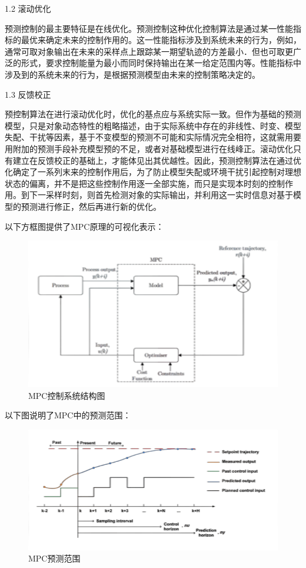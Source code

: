 1.2 滚动优化

预测控制的最主要特征是在线优化。预测控制这种优化控制算法是通过某一性能指标的最优来确定未来的控制作用的。这一性能指标涉及到系统未来的行为，例如，通常可取对象输出在未来的采样点上跟踪某一期望轨迹的方差最小．但也可取更广泛的形式，要求控制能量为最小而同时保持输出在某一给定范围内等。性能指标中涉及到的系统未来的行为，是根据预测模型由未来的控制策略决定的\cite{ArtE8}。

1.3 反馈校正

预控制算法在进行滚动优化时，优化的基点应与系统实际一致。但作为基础的预测模型，只是对象动态特性的粗略描述，由于实际系统中存在的非线性、时变、模型失配、干扰等因素，基于不变模型的预测不可能和实际情况完全相符，这就需用要用附加的预测手段补充模型预的不足，或者对基础模型进行在线峰正\cite{Art4}。滚动优化只有建立在反馈校正的基础上，才能体见出其优越性。因此，预测控制算法在通过优化确定了一系列末来的控制作用后，为了防止模型失配或环境干扰引起控制对理想状态的偏离，并不是把这些控制作用逐一全部实施，而只是实现本时刻的控制作用\cite{Art5}。到下一采样时刻，则首先检测对象的实际输出，并利用这一实时信息对基于模型的预测进行修正，然后再进行新的优化\cite{ArtE6}。

以下方框图提供了MPC原理的可视化表示：

\begin{figure}[ht]
  \centering
  \includegraphics[width=0.8\linewidth]{./Figure/MPC-Control.png}
  \caption{MPC控制系统结构图}\label{Fig:img5}
\end{figure}

以下图说明了MPC中的预测范围：

\begin{figure}[ht]
  \centering
  \includegraphics[width=0.8\linewidth]{./Figure/MPC-Prediction.png}
  \caption{MPC预测范围}\label{Fig:img6}
\end{figure}

